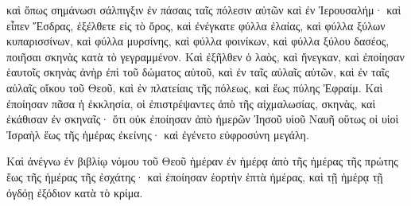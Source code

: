 {καὶ ὅπως σημάνωσι σάλπιγξιν ἐν πάσαις ταῖς πόλεσιν αὐτῶν καὶ ἐν Ἱερουσαλήμ· καὶ εἶπεν Ἔσδρας, ἐξέλθετε εἰς τὸ ὄρος, καὶ ἐνέγκατε φύλλα ἐλαίας, καὶ φύλλα ξύλων κυπαρισσίνων, καὶ φύλλα μυρσίνης, καὶ φύλλα φοινίκων, καὶ φύλλα ξύλου δασέος, ποιῆσαι σκηνὰς κατὰ τὸ γεγραμμένον.
Καὶ ἐξῆλθεν ὁ λαὸς, καὶ ἤνεγκαν, καὶ ἐποίησαν ἑαυτοῖς σκηνὰς ἀνὴρ ἐπὶ τοῦ δώματος αὐτοῦ, καὶ ἐν ταῖς αὐλαῖς αὐτῶν, καὶ ἐν ταῖς αὐλαῖς οἴκου τοῦ Θεοῦ, καὶ ἐν πλατείαις τῆς πόλεως, καὶ ἕως πύλης Ἐφραίμ.
Καὶ ἐποίησαν πᾶσα ἡ ἐκκλησία, οἱ ἐπιστρέψαντες ἀπὸ τῆς αἰχμαλωσίας, σκηνὰς, καὶ ἐκάθισαν ἐν σκηναῖς· ὅτι οὐκ ἐποίησαν ἀπὸ ἡμερῶν Ἰησοῦ υἱοῦ Ναυῆ οὕτως οἱ υἱοὶ Ἰσραὴλ ἕως τῆς ἡμέρας ἐκείνης· καὶ ἐγένετο εὐφροσύνη μεγάλη.
\par }{\PP {}Καὶ ἀνέγνω ἐν βιβλίῳ νόμου τοῦ Θεοῦ ἡμέραν ἐν ἡμέρᾳ ἀπὸ τῆς ἡμέρας τῆς πρώτης ἕως τῆς ἡμέρας τῆς ἐσχάτης· καὶ ἐποίησαν ἑορτὴν ἑπτὰ ἡμέρας, καὶ τῇ ἡμέρᾳ τῇ ὀγδόῃ ἐξόδιον κατὰ τὸ κρίμα.

}
